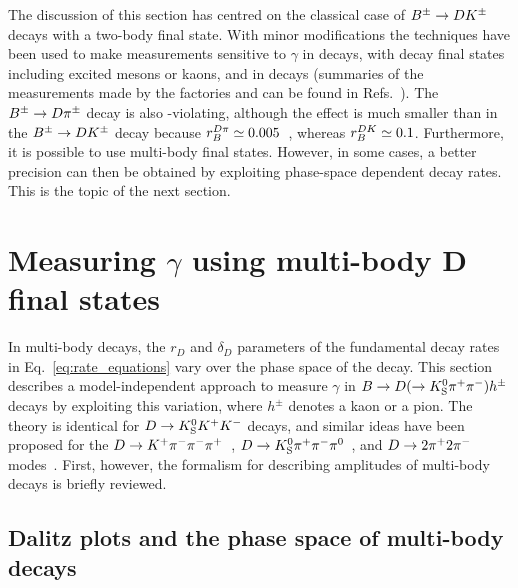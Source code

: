 The discussion of this section has centred on the classical case of ${{B}^\pm}\rightarrow D{{K}^\pm}$ decays with a two-body \D final state. With minor modifications the techniques have been used to make measurements sensitive to $\gamma$ in \Bz decays, with \B decay final states including excited \D mesons or kaons, and in \BtoDpi decays (summaries of the measurements made by the \B factories and \lhcb can be found in Refs.~\cite{BelleCombo,BabarCombo,LHCb-PAPER-2016-032,LHCb-CONF-2018-002}). The ${{B}^\pm}\rightarrow D {{\pi}^\pm}$ decay is also \CP-violating, although the effect is much smaller than in the ${{B}^\pm}\rightarrow D{{K}^\pm}$ decay because $r_B^{{D}\pi}\simeq 0.005$~\cite{rDpi}, whereas $r_B^{{D} K}\simeq 0.1$. Furthermore, it is possible to use multi-body \D final states. However, in some cases, a better precision can then be obtained by exploiting phase-space dependent decay rates. This is the topic of the next section.



\section{\texorpdfstring{Measuring $\gamma$ using multi-body D final states}{Measuring gamma using multi-body D final states}} %
\label{sec:gamma_with_multibody_d_final_states}


In multi-body \D decays, the $r_D$ and $\delta_D$ parameters of the fundamental decay rates in Eq.~\eqref{eq:rate_equations} vary over the phase space of the \D decay. This section describes a model-independent approach to measure $\gamma$ in ${B}\rightarrow{\ensuremath{D}}(\rightarrow{\ensuremath{{K}^0_{\mathrm{S}}}}{\ensuremath{{\pi}^+}}{\ensuremath{{\pi}^-}})h^\pm$ decays by exploiting this variation, where $h^\pm$ denotes a kaon or a pion. The theory is identical for ${D}\rightarrow{\ensuremath{{K}^0_{\mathrm{S}}}}{\ensuremath{{K}^+}}{\ensuremath{{K}^-}}$ decays, and similar ideas have been proposed for the ${D}\rightarrow{\ensuremath{{K}^+}}{\ensuremath{{\pi}^-}}{\ensuremath{{\pi}^-}}{\ensuremath{{\pi}^+}}$~\cite{evansImprovedSensitivityCKM2020}, ${D}\rightarrow{\ensuremath{{K}^0_{\mathrm{S}}}}{\ensuremath{{\pi}^+}}{\ensuremath{{\pi}^-}}{\ensuremath{{\pi}^0}}$~\cite{CLEOKSpipipi0}, and ${D}\rightarrow2{{\pi}^+}2{{\pi}^-}$ modes~\cite{harnewModelindependentDeterminationStrong2018}. First, however, the formalism for describing amplitudes of multi-body decays is briefly reviewed.


\subsection{Dalitz plots and the phase space of multi-body decays} %
\label{sub:the_phase_space_of_multibody_decays_and_dalitz_plots}

